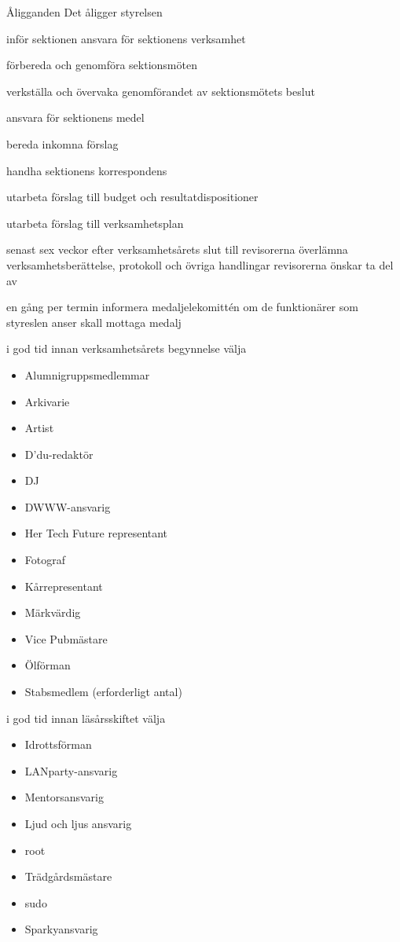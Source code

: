 \documentclass[pdfbookmarks,a4paper,11pt]{article}
\newlength{\itemcollength}
\newenvironment{reglemlista}{%
  \begin{list}{}{%
      \setlength{\labelwidth}{\itemcollength}%
      \setlength{\leftmargin}{\labelwidth + \labelsep}%
      \renewcommand{\makelabel}[1]{%
        \raisebox{0pt}[1ex][0pt]{%
          \makebox[\labelwidth][l]{%
            \parbox[t]{\itemcollength}{%
              \raggedright\hspace{0pt}##1}}}\hfill}%
      }}{%
  \end{list}}
\begin{document}
\begin{reglemlista}

  \item[Åligganden]
    Det åligger styrelsen
    \begin{attlista}
      \item inför sektionen ansvara för sektionens verksamhet
      \item förbereda och genomföra sektionsmöten
      \item verkställa och övervaka genomförandet av sektionsmötets beslut
      \item ansvara för sektionens medel
      \item bereda inkomna förslag
      \item handha sektionens korrespondens
      \item utarbeta förslag till budget och resultatdispositioner
      \item utarbeta förslag till verksamhetsplan
      \item senast sex veckor efter verksamhetsårets slut till revisor\-erna överlämna verksamhetsberättelse, protokoll och övriga handlingar revisorerna önskar ta del av
      \item en gång per termin informera medaljelekomittén om de funktionärer som styreslen anser skall mottaga medalj
      \item i god tid innan verksamhetsårets begynnelse välja
        \begin{itemize}
	\item Alumnigruppsmedlemmar
          	\item Arkivarie
          	\item Artist
          	\item D'du-redaktör
          	\item DJ
          	\item DWWW-ansvarig
         	\item Her Tech Future representant
          	\item Fotograf
	\item Kårrepresentant
          	\item Märkvärdig
          \item Vice Pubmästare
          \item Ölförman
          \item Stabsmedlem (erforderligt antal)
        \end{itemize}
      \item i god tid innan läsårsskiftet välja
        \begin{itemize}
          \item Idrottsförman
          \item LANparty-ansvarig
          \item Mentorsansvarig
          \item Ljud och ljus ansvarig
          \item root
          \item Trädgårdsmästare
          \item sudo
          \item Sparkyansvarig
        \end{itemize}
    \end{attlista}


\end{reglemlista}
\end{document}
